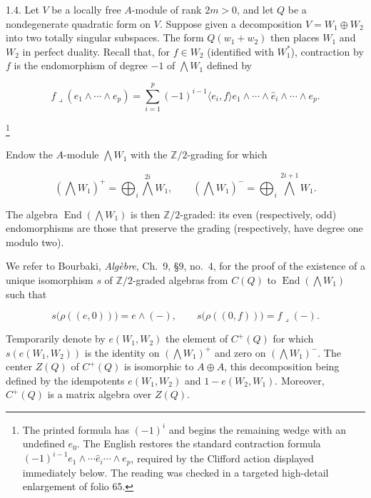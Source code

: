 1.4. Let $V$ be a locally free $A$-module of rank $2m>0$, and let $Q$
be a nondegenerate quadratic form on $V$.  Suppose given a decomposition
$V=W_1\oplus W_2$ into two totally singular subspaces.  The form
$Q(w_1+w_2)$ then places $W_1$ and $W_2$ in perfect duality.  Recall that,
for $f\in W_2$ (identified with $W_1^*$), contraction by $f$ is the
endomorphism of degree $-1$ of $\bigwedge W_1$ defined by

\begin{equation*}
f\mathbin{\lrcorner}(e_1\wedge\cdots\wedge e_p)
=\sum_{i=1}^{p}(-1)^{i-1}\langle e_i,f\rangle
e_1\wedge\cdots\wedge\widehat e_i\wedge\cdots\wedge e_p.
\end{equation*}

\footnote{The printed formula has $(-1)^i$ and begins the remaining wedge
with an undefined $e_0$.  The English restores the standard contraction
formula $(-1)^{i-1}e_1\wedge\cdots\widehat e_i\cdots\wedge e_p$, required
by the Clifford action displayed immediately below.  The reading was
checked in a targeted high-detail enlargement of folio 65.}

Endow the $A$-module $\bigwedge W_1$ with the $\mathbb Z/2$-grading for
which


\begin{equation*}
(\bigwedge W_1)^+=\bigoplus_i\bigwedge^{2i}W_1,
\qquad
(\bigwedge W_1)^-=\bigoplus_i\bigwedge^{2i+1}W_1.
\end{equation*}

The algebra $\operatorname{End}(\bigwedge W_1)$ is then
$\mathbb Z/2$-graded: its even (respectively, odd) endomorphisms are those
that preserve the grading (respectively, have degree one modulo two).

We refer to Bourbaki, \emph{Algèbre}, Ch.~9, \S9, no.~4, for the proof of
the existence of a unique isomorphism $s$ of $\mathbb Z/2$-graded algebras
from $C(Q)$ to $\operatorname{End}(\bigwedge W_1)$ such that

\begin{equation*}
s\bigl(\rho((e,0))\bigr)=e\wedge(-),
\qquad
s\bigl(\rho((0,f))\bigr)=f\mathbin{\lrcorner}(-).
\end{equation*}

Temporarily denote by $e(W_1,W_2)$ the element of $C^+(Q)$ for which
$s(e(W_1,W_2))$ is the identity on $(\bigwedge W_1)^+$ and zero on
$(\bigwedge W_1)^-$.  The center $Z(Q)$ of $C^+(Q)$ is isomorphic to
$A\oplus A$, this decomposition being defined by the idempotents
$e(W_1,W_2)$ and $1-e(W_2,W_1)$.  Moreover, $C^+(Q)$ is a matrix algebra
over $Z(Q)$.

